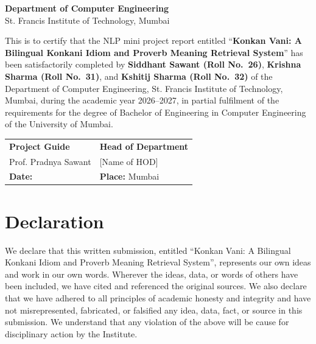 \documentclass[12pt,a4paper]{article}
\let\oldsection\section
\renewcommand{\section}{\clearpage\oldsection}
\begin{document}
\vspace{0.5cm}
\begin{center}
\textbf{Department of Computer Engineering}\\
St. Francis Institute of Technology, Mumbai
\end{center}
\vspace{0.5cm}

\begin{justify}
This is to certify that the NLP mini project report entitled ``\textbf{Konkan Vani: A Bilingual Konkani Idiom and Proverb Meaning Retrieval System}'' has been satisfactorily completed by \textbf{Siddhant Sawant (Roll No.\ 26)}, \textbf{Krishna Sharma (Roll No.\ 31)}, and \textbf{Kshitij Sharma (Roll No.\ 32)} of the Department of Computer Engineering, St. Francis Institute of Technology, Mumbai, during the academic year 2026--2027, in partial fulfilment of the requirements for the degree of Bachelor of Engineering in Computer Engineering of the University of Mumbai.
\end{justify}

\vspace{3cm}
\noindent
\begin{tabularx}{\textwidth}{XX}
\textbf{Project Guide} & \textbf{Head of Department}\\[0.3cm]
Prof. Pradnya Sawant & [Name of HOD]\\[2.5cm]
\textbf{Date:} & \textbf{Place:} Mumbai\\
\end{tabularx}
\newpage

\section*{\centering Declaration}

\vspace{0.5cm}
\begin{justify}
We declare that this written submission, entitled ``Konkan Vani: A Bilingual Konkani Idiom and Proverb Meaning Retrieval System'', represents our own ideas and work in our own words. Wherever the ideas, data, or words of others have been included, we have cited and referenced the original sources. We also declare that we have adhered to all principles of academic honesty and integrity and have not misrepresented, fabricated, or falsified any idea, data, fact, or source in this submission. We understand that any violation of the above will be cause for disciplinary action by the Institute.
\end{justify}
\end{document}
